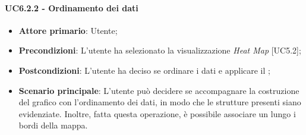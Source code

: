 \paragraph{UC6.2.2 - Ordinamento dei dati}
\begin{itemize}
	\item \textbf{Attore primario}: Utente;
	\item \textbf{Precondizioni}: L'utente ha selezionato la visualizzazione \textit{Heat Map} [UC5.2];
	\item \textbf{Postcondizioni}: L'utente ha deciso se ordinare i dati e applicare il ;
	
	\item \textbf{Scenario principale}: L'utente può decidere se accompagnare la costruzione del grafico con l'ordinamento dei dati, in modo che le strutture presenti siano evidenziate. Inoltre, fatta questa operazione, è possibile associare un  lungo i bordi della mappa.
\end{itemize}